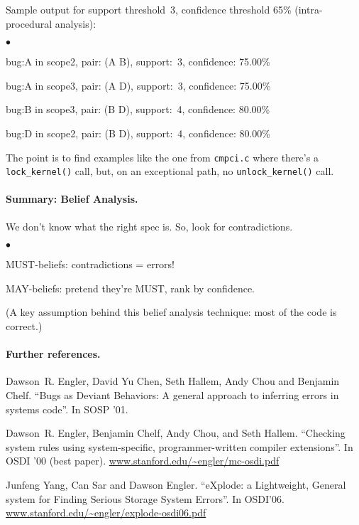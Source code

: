 \documentclass[11pt]{article}
\newcommand{\squishlist}{
 \begin{list}{$\bullet$}
  { \setlength{\itemsep}{0pt}
     \setlength{\parsep}{3pt}
     \setlength{\topsep}{3pt}
     \setlength{\partopsep}{0pt}
     \setlength{\leftmargin}{1.5em}
     \setlength{\labelwidth}{1em}
     \setlength{\labelsep}{0.5em} } }
\newcommand{\squishend}{
  \end{list}  }
\begin{document}
Sample output for support threshold~3, confidence threshold 65\% (intra-procedural analysis):
{\small
\squishlist
\item bug:A in scope2, pair: (A B), support:~3, confidence: 75.00\%
\item bug:A in scope3, pair: (A D), support:~3, confidence: 75.00\%
\item bug:B in scope3, pair: (B D), support:~4, confidence: 80.00\%
\item bug:D in scope2, pair: (B D), support:~4, confidence: 80.00\%
\squishend
}

The point is to find examples like the one from {\tt cmpci.c}
where there's a {\tt lock\_kernel()} call, but, on an exceptional path, no
{\tt unlock\_kernel()} call.
\vspace*{-1em}

\paragraph{Summary: Belief Analysis.}
      We don't know what the right spec is.
      So, look for contradictions.

\squishlist
\item      MUST-beliefs: contradictions = errors!
\item      MAY-beliefs: pretend they're MUST, rank by confidence.
\squishend
(A key assumption behind this belief analysis technique: most of the code is correct.)

\paragraph{Further references.}
Dawson~R. Engler, David Yu Chen, Seth Hallem, Andy Chou and Benjamin Chelf.
``Bugs as Deviant Behaviors: A general approach to inferring errors in systems code''.
In SOSP '01.

Dawson~R. Engler, Benjamin Chelf, Andy Chou, and Seth Hallem.
``Checking system rules using system-specific, programmer-written
  compiler extensions''.
In OSDI '00 (best paper).
\url{www.stanford.edu/~engler/mc-osdi.pdf}

Junfeng Yang, Can Sar and Dawson Engler.
``eXplode: a Lightweight, General system for Finding Serious Storage System Errors''.
In OSDI'06.
\url{www.stanford.edu/~engler/explode-osdi06.pdf}
\end{document}

